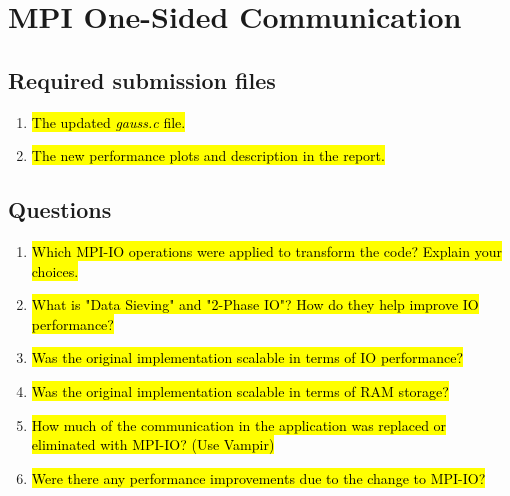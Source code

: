 \section{MPI One-Sided Communication}
\subsection{Required submission files}
\begin{enumerate}
  \item \hl{The updated \emph{gauss.c} file.}

  \item \hl{The new performance plots and description in the report.}

\end{enumerate}

\subsection{Questions}
\begin{enumerate}
  \item \hl{Which MPI-IO operations were applied to transform the code? Explain your choices.}
  
  \item \hl{What is "Data Sieving" and "2-Phase IO"? How do they help improve IO
performance?}

  \item \hl{Was the original implementation scalable in terms of IO performance?}
  
  \item \hl{Was the original implementation scalable in terms of RAM storage?}
  
  \item \hl{How much of the communication in the application was replaced or eliminated with MPI-IO? (Use
Vampir)}

  \item \hl{Were there any performance improvements due to the change to MPI-IO?}

\end{enumerate}
